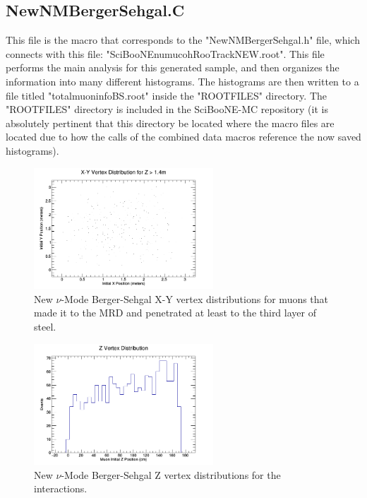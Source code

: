 \documentclass[11pt]{article}
\begin{document}
\subsection{NewNMBergerSehgal.C}
This file is the macro that corresponds to the "NewNMBergerSehgal.h" file, which connects with this file: "SciBooNE\textunderscore numu\textunderscore coh\textunderscore RooTrack\textunderscore NEW.root". This file performs the main analysis for this generated sample, and then organizes the information into many different histograms. The histograms are then written to a file titled "totalmuoninfoBS.root" inside the "ROOTFILES" directory. The "ROOTFILES" directory is included in the SciBooNE-MC repository (it is absolutely pertinent that this directory be located where the macro files are located due to how the calls of the combined data macros reference the now saved histograms).

\begin{figure}[H]
\centering
\includegraphics[width=0.6\textwidth]{NewNMBergerSehgalImages/1-X-YVertexDistributionNMBS.png}
\caption{New $\nu$-Mode Berger-Sehgal X-Y vertex distributions for muons that made it to the MRD and penetrated at least to the third layer of steel.}
\end{figure}

\begin{figure}[H]
\centering
\includegraphics[width=0.6\textwidth]{NewNMBergerSehgalImages/2-ZVertexDistributionNMBS.png}
\caption{New $\nu$-Mode Berger-Sehgal Z vertex distributions for the interactions.}
\end{figure}
\end{document}
